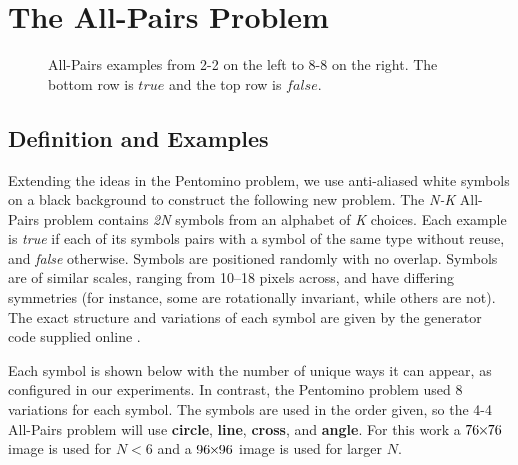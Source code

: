 
\section{The All-Pairs Problem} \label{all_pairs}
\begin{figure}[h!]
\vskip 0.2in
\begin{center}
\caption{All-Pairs examples from 2-2 on the left to 8-8 on the right.  The bottom row is $true$ and the top row is $false$.}
\label{example8}
\end{center}
\vskip -0.2in
\end{figure}


\subsection{Definition and Examples}

Extending the ideas in the Pentomino problem, we use anti-aliased white
symbols on a black background to construct the following new problem.
The \textit{N-K} All-Pairs problem contains \textit{2N} symbols from an
alphabet of \textit{K} choices.  Each example is \textit{true} if each of its
symbols pairs with a symbol of the same type without reuse,
and \textit{false} otherwise.  Symbols are positioned randomly with no
overlap.  Symbols are of similar scales, ranging from
10--18 pixels across, and have differing symmetries (for instance, some
are rotationally invariant, while others are not).  The exact structure
and variations of each symbol are given by the generator code supplied
online \cite{allpairs2018}.

Each symbol is shown below with the
number of unique ways it can appear, as configured in our experiments.  In contrast, the
Pentomino problem used 8
variations for each symbol. The symbols are used in the order given, so the 4-4 All-Pairs problem will use \textbf{circle}, \textbf{line}, \textbf{cross}, and \textbf{angle}.  For this work a $76{\mkern-1.5mu\times\mkern-1.5mu}76$ image is used for $N<6$ and a
$96{\mkern-1.5mu\times\mkern-1.5mu}96$ image is used for larger $N$.

